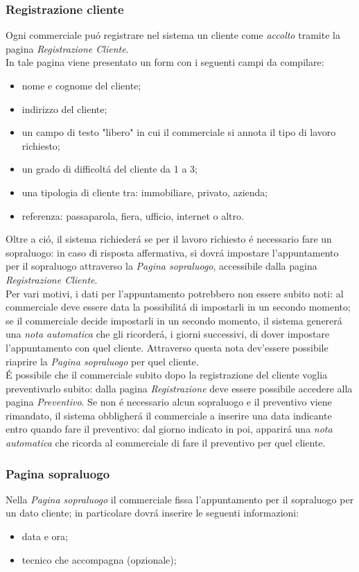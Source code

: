 \documentclass[paper=a4, fontsize=11pt]{scrartcl} %
\numberwithin{equation}{section} %
\numberwithin{figure}{section} %
\numberwithin{table}{section} %
\begin{document}
\subsubsection{Registrazione cliente}
Ogni commerciale pu\'o registrare nel sistema un cliente come \textit{accolto}
tramite la pagina \textit{Registrazione Cliente}.\\
In tale pagina viene presentato un form con i seguenti campi da compilare:
\begin{itemize}
    \item nome e cognome del cliente;
    \item indirizzo del cliente;
    \item un campo di testo "libero" in cui il commerciale si annota il tipo di lavoro richiesto;
    \item un grado di difficolt\'a del cliente da 1 a 3;
    \item una tipologia di cliente tra: immobiliare, privato, azienda;
    \item referenza: passaparola, fiera, ufficio, internet o altro.
\end{itemize}

Oltre a ci\'o, il sistema richieder\'a se per il lavoro richiesto \'e necessario fare un sopraluogo:
in caso di risposta affermativa, si dovr\'a impostare l'appuntamento per il sopraluogo attraverso la \textit{Pagina sopraluogo},
accessibile dalla pagina \textit{Registrazione Cliente}.\\
Per vari motivi, i dati per l'appuntamento potrebbero non essere subito noti: al commerciale deve essere data
la possibilit\'a di impostarli in un secondo momento; se il commerciale decide impostarli in un secondo momento,
il sistema generer\'a una \textit{nota automatica} che gli ricorder\'a, i giorni successivi, di dover impostare
l'appuntamento con quel cliente.
Attraverso questa nota dev'essere possibile riaprire la \textit{Pagina sopraluogo} per quel cliente.\\
\'E possibile che il commerciale subito dopo la registrazione del cliente voglia preventivarlo subito:
dalla pagina \textit{Registrazione} deve essere possibile accedere alla pagina \textit{Preventivo}.
Se non \'e necessario alcun sopraluogo e il preventivo viene rimandato, il sistema obbligher\'a il
commerciale a inserire una data indicante entro quando fare il preventivo: dal giorno indicato in poi, apparir\'a
una \textit{nota automatica} che ricorda al commerciale di fare il preventivo per quel cliente.

\subsubsection{Pagina sopraluogo}
Nella \textit{Pagina sopraluogo} il commerciale fissa l'appuntamento per il sopraluogo per un dato cliente;
in particolare dovr\'a inserire le seguenti informazioni:
\begin{itemize}
    \item data e ora;
    \item tecnico che accompagna (opzionale);
\end{itemize}
\end{document}
